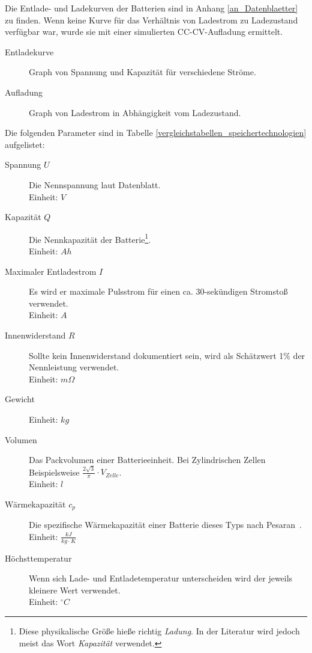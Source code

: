 Die Entlade- und Ladekurven der Batterien sind in Anhang \ref{an_Datenblaetter} zu finden. Wenn keine Kurve für das Verhältnis von Ladestrom zu Ladezustand verfügbar war, wurde sie mit einer simulierten CC-CV-Aufladung ermittelt.
\begin{description}
	\item[Entladekurve] Graph von Spannung und Kapazität für verschiedene Ströme.
	\item[Aufladung] Graph von Ladestrom in Abhängigkeit vom Ladezustand.
\end{description}
Die folgenden Parameter sind in Tabelle \ref{vergleichstabellen_speichertechnologien} aufgelistet:
\begin{description}
	\item[Spannung $U$] Die Nennspannung laut Datenblatt.\\
	Einheit: $V$
	\item[Kapazität $Q$] Die Nennkapazität der Batterie\footnote{Diese physikalische Größe hieße richtig \emph{Ladung}. In der Literatur wird jedoch meist das Wort \emph{Kapazität} verwendet.}.\\
	Einheit: $Ah$
	\item[Maximaler Entladestrom $I$] Es wird er maximale Pulsstrom für einen ca. 30-sekündigen Stromstoß verwendet.\\
	Einheit: $A$
	\item[Innenwiderstand $R$] Sollte kein Innenwiderstand dokumentiert sein, wird als Schätzwert 1\% der Nennleistung verwendet.\\
	Einheit: $m\Omega$
	\item[Gewicht] Einheit: $kg$
	\item[Volumen] Das Packvolumen einer Batterieeinheit. Bei Zylindrischen Zellen Beispielsweise $\frac{2\sqrt{3}}{\pi} \cdot V_{Zelle}$.\\
	Einheit: $l$
	\item[Wärmekapazität $c_p$] Die spezifische Wärmekapazität einer Batterie dieses Typs nach Pesaran~\cite{pesaran2001battery}.\\
	Einheit: $\frac{kJ}{kg\cdot K}$
	\item[Höchsttemperatur] Wenn sich Lade- und Entladetemperatur unterscheiden wird der jeweils kleinere Wert verwendet.\\
	Einheit: $^{\circ}C$
\end{description}


